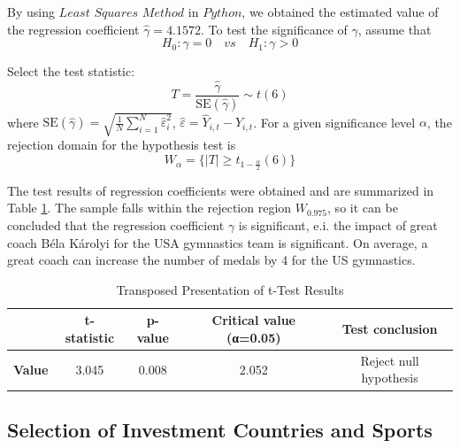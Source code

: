 \documentclass{mcmthesis}
\begin{document}
By using $Least$ $Squares$ $Method$ in $Python$, we obtained the estimated value of the regression coefficient $\hat{\gamma}=4.1572$. To test the significance of $\gamma$, assume that
\begin{equation*}
	H_0: \gamma=0 \quad vs \quad H_1: \gamma>0
\end{equation*}

Select the test statistic:
\begin{equation*}
	T=\frac{ \hat{\gamma} }{ \text{SE}(\hat{\gamma}) } \sim t(6)
\end{equation*}
where $\text{SE}(\hat{\gamma}) = \sqrt{ \frac{1}{N} \sum_{i=1}^{N} \hat{\varepsilon}_i^2 }$, $\hat{\varepsilon}=\hat{Y}_{i,t}-Y_{i,t}$. For a given significance level $\alpha$, the rejection domain for the hypothesis test is
\begin{equation*}
	W_\alpha = \big\{ |T| \ge t_{1-\frac{\alpha}{2}}(6) \big\}
\end{equation*}

The test results of regression coefficients were obtained and are summarized in Table \ref{table:great-coach-effect_t-test}. The sample falls within the rejection region $W_{0.975}$, so it can be concluded that the regression coefficient $\gamma$ is significant, e.i. the impact of great coach Béla Károlyi for the USA gymnastics team is significant. On average, a great coach can increase the number of medals by 4 for the US gymnastics.
\begin{table}[H]
	\centering
	\caption{Transposed Presentation of t-Test Results}
	\label{table:great-coach-effect_t-test}
	\begin{tabular}{lcccc}
		\toprule
		\rowcolor{red!10}
		& \textbf{t-statistic} & \textbf{p-value} & \textbf{Critical value (α=0.05)} & \textbf{Test conclusion} \\
		\midrule
		\rowcolor{white} %
		\textbf{Value} & 3.045 & 0.008 & 2.052 & Reject null hypothesis \\
		\bottomrule
	\end{tabular}
\end{table}






\subsection{Selection of Investment Countries and Sports}

\end{document}
